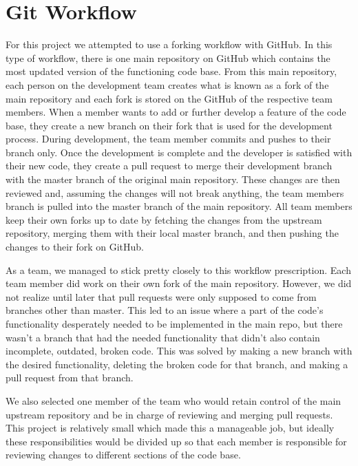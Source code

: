 \documentclass{article}
\begin{document}
	\section{Git Workflow}
	For this project we attempted to use a forking workflow with GitHub. In this type of workflow, there is one main repository on GitHub which contains the most updated version of the functioning code base. From this main repository, each person on the development team creates what is known as a fork of the main repository and each fork is stored on the GitHub of the respective team members. When a member wants to add or further develop a feature of the code base, they create a new branch on their fork that is used for the development process. During development, the team member commits and pushes to their branch only. Once the development is complete and the developer is satisfied with their new code, they create a pull request to merge their development branch with the master branch of the original main repository. These changes are then reviewed and, assuming the changes will not break anything, the team members branch is pulled into the master branch of the main repository. All team members keep their own forks up to date by fetching the changes from the upstream repository, merging them with their local master branch, and then pushing the changes to their fork on GitHub.
	
	As a team, we managed to stick pretty closely to this workflow prescription. Each team member did work on their own fork of the main repository. However, we did not realize until later that pull requests were only supposed to come from branches other than master. This led to an issue where a part of the code’s functionality desperately needed to be implemented in the main repo, but there wasn’t a branch that had the needed functionality that didn’t also contain incomplete, outdated, broken code. This was solved by making a new branch with the desired functionality, deleting the broken code for that branch, and making a pull request from that branch. 
	
	We also selected one member of the team who would retain control of the main upstream repository and be in charge of reviewing and merging pull requests. This project is relatively small which made this a manageable job, but ideally these responsibilities would be divided up so that each member is responsible for reviewing changes to different sections of the code base. 
\end{document}
